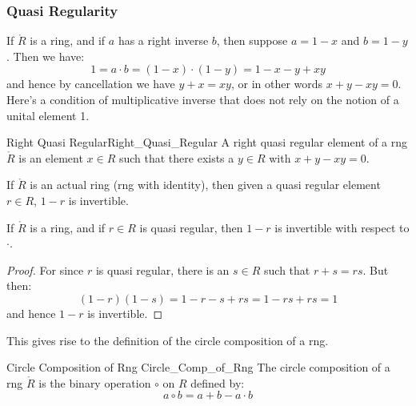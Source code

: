         \subsubsection{Quasi Regularity}
            If $\ring{R}$ is a ring, and if $a$ has a right inverse $b$,
            then suppose $a=1-x$ and $b=1-y$. Then we have:
            \begin{equation}
                1=a\cdot{b}=(1-x)\cdot(1-y)=1-x-y+xy
            \end{equation}
            and hence by cancellation we have $y+x=xy$, or in other words
            $x+y-xy=0$. Here's a condition of multiplicative inverse that
            does not rely on the notion of a unital element 1.
            \begin{fdefinition}{Right Quasi Regular}{Right_Quasi_Regular}
                A right quasi regular element of a rng $\ring{R}$ is an
                element $x\in{R}$ such that there exists a $y\in{R}$ with
                $x+y-xy=0$.
            \end{fdefinition}
            If $\ring{R}$ is an actual ring (rng with identity), then given
            a quasi regular element $r\in{R}$, $1-r$ is invertible.
            \begin{theorem}
                If $\ring{R}$ is a ring, and if $r\in{R}$ is quasi regular,
                then $1-r$ is invertible with respect to $\cdot$.
            \end{theorem}
            \begin{proof}
                For since $r$ is quasi regular, there is an $s\in{R}$ such
                that $r+s=rs$. But then:
                \begin{equation}
                    (1-r)(1-s)=1-r-s+rs=1-rs+rs=1
                \end{equation}
                and hence $1-r$ is invertible.
            \end{proof}
            This gives rise to the definition of the circle composition of a
            rng.
            \begin{fdefinition}{Circle Composition of Rng}
                               {Circle_Comp_of_Rng}
                The circle composition of a rng $\ring{R}$ is the binary
                operation $\circ$ on $R$ defined by:
                \begin{equation*}
                    a\circ{b}=a+b-a\cdot{b}
                \end{equation*}
            \end{fdefinition}
